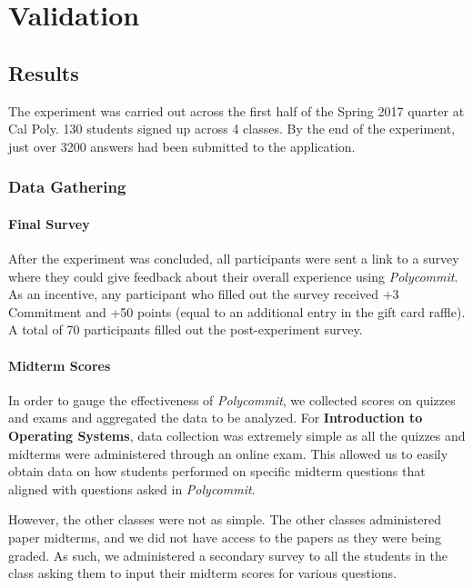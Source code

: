 \chapter{Validation}
\section{Results}
\par The experiment was carried out across the first half of the Spring 2017 quarter at Cal Poly. 130 students signed up across 4 classes. By the end of the experiment, just over 3200 answers had been submitted to the application.

\subsection{Data Gathering}
\subsubsection{Final Survey}
\par After the experiment was concluded, all participants were sent a link to a survey where they could give feedback about their overall experience using \textit{Polycommit}. As an incentive, any participant who filled out the survey received +3 Commitment and +50 points (equal to an additional entry in the gift card raffle). A total of 70 participants filled out the post-experiment survey.

\subsubsection{Midterm Scores}
\par In order to gauge the effectiveness of \textit{Polycommit}, we collected scores on quizzes and exams and aggregated the data to be analyzed. For \textbf{Introduction to Operating Systems}, data collection was extremely simple as all the quizzes and midterms were administered through an online exam. This allowed us to easily obtain data on how students performed on specific midterm questions that aligned with questions asked in \textit{Polycommit}.

\par However, the other classes were not as simple. The other classes administered paper midterms, and we did not have access to the papers as they were being graded. As such, we administered a secondary survey to all the students in the class asking them to input their midterm scores for various questions.

